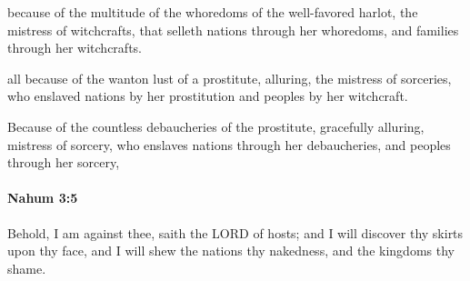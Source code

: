 			\begin{versebox}
					\item[BHS] 
					\item[LXX] 
					\item[ASV] because of the multitude of the whoredoms of the well-favored harlot, the mistress of witchcrafts, that selleth nations through her whoredoms, and families through her witchcrafts.
					\item[NIV] all because of the wanton lust of a prostitute, alluring, the mistress of sorceries, who enslaved nations by her prostitution and peoples by her witchcraft.
					\item[NRSV] Because of the countless debaucheries of the prostitute, gracefully alluring, mistress of sorcery, who enslaves nations through her debaucheries, and peoples through her sorcery,
			\end{versebox}

		\paragraph{Nahum 3:5} %
			\label{NAHUM-3-5}

			Behold, I am against thee, saith the LORD of hosts; and I will discover thy skirts upon thy face, and I will shew the nations thy nakedness, and the kingdoms thy shame.

